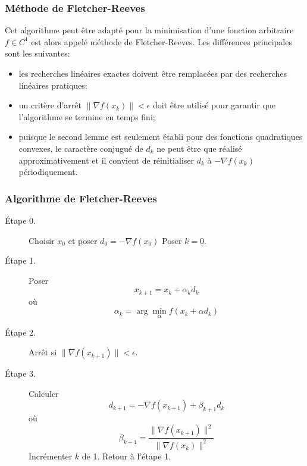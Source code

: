 \documentclass[usepdftitle=false]{beamer}
\begin{document}
\begin{frame}
	\frametitle{Méthode de Fletcher-Reeves}
	
	Cet algorithme peut être adapté pour la minimisation d'une fonction arbitraire $f \in C^1$ est alors appelé méthode de Fletcher-Reeves.
	Les différences principales sont les suivantes:
	\begin{itemize}
		\item
		les recherches linéaires exactes doivent être remplacées par des recherches linéaires pratiques;
		\item
		un critère d'arrêt $\| \nabla f(x_k) \| < \epsilon$ doit être utilisé pour garantir que l'algorithme se termine en temps fini;
		\item
		puisque le second lemme est seulement établi pour des fonctions quadratiques convexes, le caractère conjugué de $d_k$ ne peut être que réalisé approximativement et il convient de réinitialiser $d_k$ à $-\nabla f(x_k)$ périodiquement.
	\end{itemize}
	
\end{frame}

\begin{frame}
	\frametitle{Algorithme de Fletcher-Reeves}
	
	\begin{description}
		\item[Étape 0.]
		Choisir $x_0$ et poser $d_0 = -\nabla f (x_0)$
		Poser $k = 0$.
		\item[Étape 1.]
		Poser
		$$
		x_{k+1} = x_k + \alpha_{k}d_k
		$$
		où
		$$
		\alpha_k = \arg \min_{\alpha} f (x_k + \alpha d_k )
		$$
		\item[Étape 2.]
Arrêt si $\| \nabla f(x_{k+1}) \| < \epsilon$.
		\item[Étape 3.]
Calculer
$$
d_{k+1} = - \nabla f(x_{k+1})+ \beta_{k+1} d_{k}
$$
où
$$
\beta_{k+1} = \frac{\| \nabla f(x_{k+1}) \|^2}{\| \nabla f(x_{k}) \|^2}
$$
Incrémenter $k$ de 1.
Retour à l'étape 1.
	\end{description}
	
\end{frame}
\end{document}
